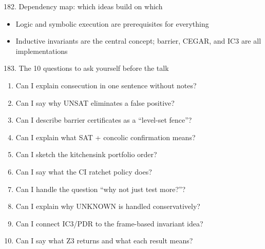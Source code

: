 \documentclass[aspectratio=169]{beamer}
\begin{document}
\begin{frame}{182. Dependency map: which ideas build on which}
\begin{center}
\end{center}
\begin{itemize}
  \item Logic and symbolic execution are prerequisites for everything
  \item Inductive invariants are the central concept; barrier, CEGAR, and IC3 are all implementations
\end{itemize}
\end{frame}

\begin{frame}{183. The 10 questions to ask yourself before the talk}
\begin{enumerate}
  \item Can I explain consecution in one sentence without notes?
  \item Can I say why UNSAT eliminates a false positive?
  \item Can I describe barrier certificates as a ``level-set fence''?
  \item Can I explain what SAT + concolic confirmation means?
  \item Can I sketch the kitchensink portfolio order?
  \item Can I say what the CI ratchet policy does?
  \item Can I handle the question ``why not just test more?''?
  \item Can I explain why UNKNOWN is handled conservatively?
  \item Can I connect IC3/PDR to the frame-based invariant idea?
  \item Can I say what Z3 returns and what each result means?
\end{enumerate}
\end{frame}
\end{document}
